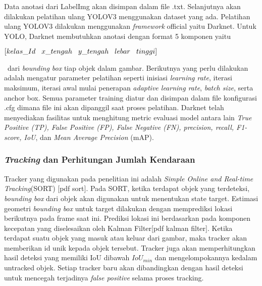\documentclass[../thesis.tex]{subfiles}
\begin{document}
Data anotasi dari LabelImg akan disimpan dalam file .txt. Selanjutnya akan dilakukan pelatihan ulang YOLOV3 menggunakan dataset yang ada. Pelatihan ulang YOLOV3 dilakukan menggunakan \textit{framework} official yaitu Darknet. Untuk YOLO, Darknet membutuhkan anotasi dengan format
5 komponen yaitu \\ 
\centerline{$[kelas\_Id \hspace{3mm} x\_tengah \hspace{3mm} y\_tengah \hspace{3mm} lebar \hspace{3mm} tinggi]$}\
dari \textit{bounding box} tiap objek dalam gambar. Berikutnya yang perlu dilakukan adalah mengatur parameter pelatihan seperti inisiasi \textit{learning rate}, iterasi maksimum, iterasi awal mulai penerapan \textit{adaptive learning rate}, \textit{batch size}, serta anchor box. Semua parameter training diatur dan disimpan dalam file konfigurasi .cfg dimana file ini akan 
dipanggil saat proses pelatihan. Darknet telah menyediakan fasilitas untuk menghitung metric evaluasi model antara lain \textit{True Positive (TP), False Positive (FP), False Negative (FN), precision, recall, F1-score, IoU}, dan \textit{Mean Average Precision} (mAP).

\subsubsection{\textit{Tracking} dan Perhitungan Jumlah Kendaraan}
Tracker yang digunakan pada penelitian ini adalah \textit{Simple Online and Real-time Tracking}(SORT) [pdf sort]. Pada SORT, ketika terdapat objek yang terdeteksi, \textit{bounding box} dari objek akan digunakan untuk menentukan state target. Estimasi geometri \textit{bounding box} untuk target dilakukan dengan memprediksi lokasi berikutnya pada frame saat ini. Prediksi lokasi ini berdasarkan pada komponen kecepatan yang diselesaikan oleh Kalman Filter[pdf kalman filter].
Ketika terdapat suatu objek yang masuk atau keluar dari gambar, maka tracker akan memberikan id unik kepada objek tersebut. Tracker juga akan memperhitungkan hasil deteksi yang memiliki IoU dibawah $IoU_{min}$ dan mengelompokannya kedalam untracked objek. Setiap tracker baru akan dibandingkan dengan hasil deteksi untuk mencegah terjadinya \textit{false positive} selama proses tracking.
\end{document}
